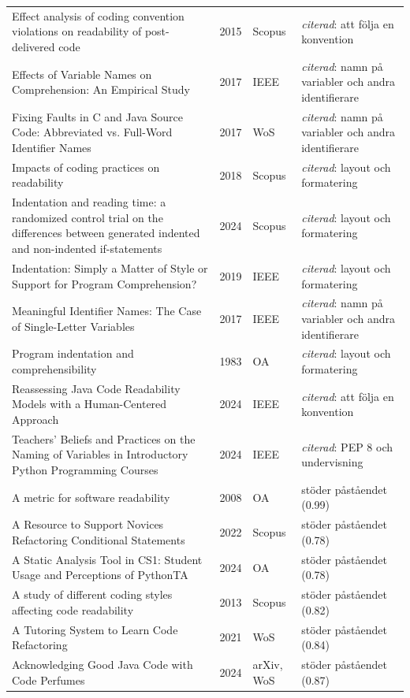 \begin{longtable}{@{}%
  >{\raggedright\arraybackslash}p{}c%
  >{\raggedright\arraybackslash}p{}%
  >{\raggedright\arraybackslash}p{}@{}}
Effect analysis of coding convention violations on readability of post-delivered code & 2015 & Scopus & \emph{citerad}: att följa en konvention \\
Effects of Variable Names on Comprehension: An Empirical Study & 2017 & IEEE & \emph{citerad}: namn på variabler och andra identifierare \\
Fixing Faults in C and Java Source Code: Abbreviated vs. Full-Word Identifier Names & 2017 & WoS & \emph{citerad}: namn på variabler och andra identifierare \\
Impacts of coding practices on readability & 2018 & Scopus & \emph{citerad}: layout och formatering \\
Indentation and reading time: a randomized control trial on the differences between generated indented and non-indented if-statements & 2024 & Scopus & \emph{citerad}: layout och formatering \\
Indentation: Simply a Matter of Style or Support for Program Comprehension? & 2019 & IEEE & \emph{citerad}: layout och formatering \\
Meaningful Identifier Names: The Case of Single-Letter Variables & 2017 & IEEE & \emph{citerad}: namn på variabler och andra identifierare \\
Program indentation and comprehensibility & 1983 & OA & \emph{citerad}: layout och formatering \\
Reassessing Java Code Readability Models with a Human-Centered Approach & 2024 & IEEE & \emph{citerad}: att följa en konvention \\
Teachers' Beliefs and Practices on the Naming of Variables in Introductory Python Programming Courses & 2024 & IEEE & \emph{citerad}: PEP 8 och undervisning \\
A metric for software readability & 2008 & OA & stöder påståendet (0.99) \\
A Resource to Support Novices Refactoring Conditional Statements & 2022 & Scopus & stöder påståendet (0.78) \\
A Static Analysis Tool in CS1: Student Usage and Perceptions of PythonTA & 2024 & OA & stöder påståendet (0.78) \\
A study of different coding styles affecting code readability & 2013 & Scopus & stöder påståendet (0.82) \\
A Tutoring System to Learn Code Refactoring & 2021 & WoS & stöder påståendet (0.84) \\
Acknowledging Good Java Code with Code Perfumes & 2024 & arXiv, WoS & stöder påståendet (0.87) \\

\end{longtable}
